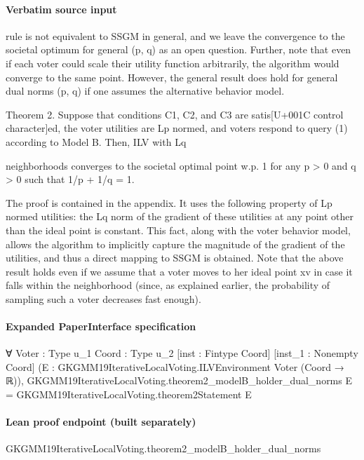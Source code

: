 \documentclass[10pt]{article}
\begin{document}
\paragraph{Verbatim source input}
\begin{ReviewVerbatim}
rule is not equivalent to SSGM in general, and we leave the convergence to the societal
optimum for general (p, q) as an open question.
Further, note that even if each voter could scale their utility function arbitrarily, the
algorithm would converge to the same point.
However, the general result does hold for general dual norms (p, q) if one assumes the
alternative behavior model.

Theorem 2. Suppose that conditions C1, C2, and C3 are satis[U+001C control character]ed, the voter utilities are
Lp normed, and voters respond to query (1) according to Model B. Then, ILV with Lq

neighborhoods converges to the societal optimal point w.p. 1 for any p > 0 and q > 0 such
that 1/p + 1/q = 1.

The proof is contained in the appendix. It uses the following property of Lp normed
utilities: the Lq norm of the gradient of these utilities at any point other than the ideal
point is constant. This fact, along with the voter behavior model, allows the algorithm to
implicitly capture the magnitude of the gradient of the utilities, and thus a direct mapping
to SSGM is obtained.
Note that the above result holds even if we assume that a voter moves to her ideal point
xv in case it falls within the neighborhood (since, as explained earlier, the probability of
sampling such a voter decreases fast enough).
\end{ReviewVerbatim}


\paragraph{Expanded PaperInterface specification}
\begin{ReviewVerbatim}
∀ {Voter : Type u_1} {Coord : Type u_2} [inst : Fintype Coord] [inst_1 : Nonempty Coord]
  (E : GKGMM19IterativeLocalVoting.ILVEnvironment Voter (Coord → ℝ)),
  GKGMM19IterativeLocalVoting.theorem2_modelB_holder_dual_norms E = GKGMM19IterativeLocalVoting.theorem2Statement E
\end{ReviewVerbatim}

\paragraph{Lean proof endpoint (built separately)}\begin{ReviewVerbatim}
GKGMM19IterativeLocalVoting.theorem2_modelB_holder_dual_norms
\end{ReviewVerbatim}
\end{document}
